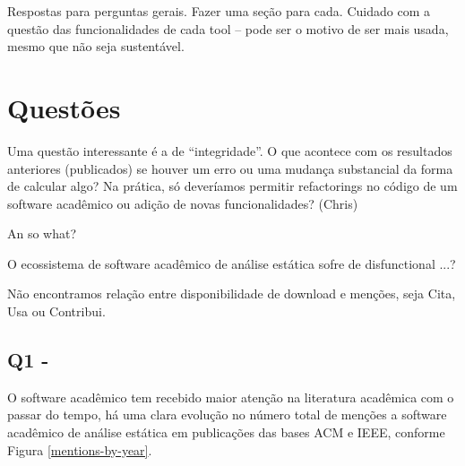 \label{discussao}


Respostas para perguntas gerais. Fazer uma seção para cada.
Cuidado com a questão das funcionalidades de cada tool -- pode ser o motivo de ser mais usada,
mesmo que não seja sustentável.

\section{Questões} 

Uma questão interessante é a de ``integridade''. 
O que acontece com os resultados anteriores (publicados)
se houver um erro ou uma mudança substancial da forma de calcular algo?
Na prática, só deveríamos permitir refactorings no código 
de um software acadêmico ou adição de novas funcionalidades?
(Chris)

An so what?

O ecossistema de software acadêmico de análise estática sofre de disfunctional ...?


Não encontramos relação entre disponibilidade de download e menções, seja Cita, Usa ou Contribui.

\subsection{Q1 - \QuestaoUm}

O software acadêmico tem recebido maior atenção na literatura acadêmica com o
passar do tempo, há uma clara evolução no número total de menções a software
acadêmico de análise estática em publicações das bases ACM e IEEE, conforme
Figura \ref{mentions-by-year}.

